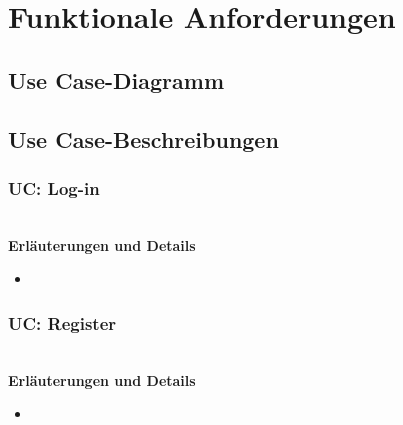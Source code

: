 \section{Funktionale Anforderungen}

\subsection{Use Case-Diagramm}

\pagebreak

\subsection{Use Case-Beschreibungen}

\subsubsection{UC: Log-in}

\\[0.5cm]
\textbf{Erläuterungen und Details}
\begin{itemize}
	\item 
\end{itemize}
\subsubsection{UC: Register}

\\[0.5cm]
\textbf{Erläuterungen und Details}
\begin{itemize}
	\item 
\end{itemize}